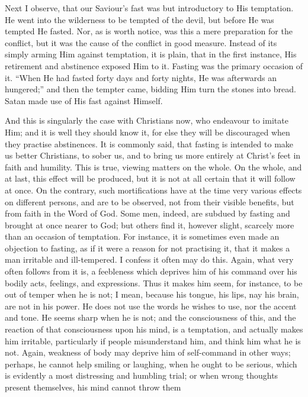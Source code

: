 Next I observe, that our Saviour's fast was but introductory to His
temptation. He went into the wilderness to be tempted of the devil,
but before He was tempted He fasted. Nor, as is worth notice, was this
a mere preparation for the conflict, but it was the cause of the
conflict in good measure. Instead of its simply arming Him against
temptation, it is plain, that in the first instance, His retirement
and abstinence exposed Him to it. Fasting was the primary occasion of
it. ``When He had fasted forty days and forty nights, He was
afterwards an hungered;'' and then the tempter came, bidding Him
turn the stones into bread. Satan made use of His fast against
Himself.

And this is singularly the case with Christians now, who endeavour
to imitate Him; and it is well they should know it, for else they will
be discouraged when they practise abstinences. It is commonly said,
that fasting is intended to make us better Christians, to sober us,
and to bring us more entirely at Christ's feet in faith and humility.
This is true, viewing matters on the whole. On the whole, and at last,
this effect will be produced, but it is not at all certain that it
will follow at once. On the contrary, such mortifications have at the
time very various effects on different persons, and are to be
observed, not from their visible benefits, but from faith in the Word
of God. Some men, indeed, are subdued by fasting and brought at once
nearer to God; but others find it, however slight, scarcely more than
an occasion of temptation. For instance, it is sometimes even made an
objection to fasting, as if it were a reason for not practising it,
that it makes a man irritable and ill-tempered. I confess it often may
do this. Again, what very often follows from it is, a feebleness which
deprives him of his command over his bodily acts, feelings, and
expressions. Thus it makes him seem, for instance, to be out of temper
when he is not; I mean, because his tongue, his lips, nay his brain,
are not in his power. He does not use the words he wishes to use, nor
the accent and tone. He seems sharp when he is not; and the
consciousness of this, and the reaction of that consciousness upon his
mind, is a temptation, and actually makes him irritable, particularly
if people misunderstand him, and think him what he is not. Again,
weakness of body may deprive him of self-command in other ways;
perhaps, he cannot help smiling or laughing, when he ought to be
serious, which is evidently a most distressing and humbling trial; or
when wrong thoughts present themselves, his mind cannot throw them
